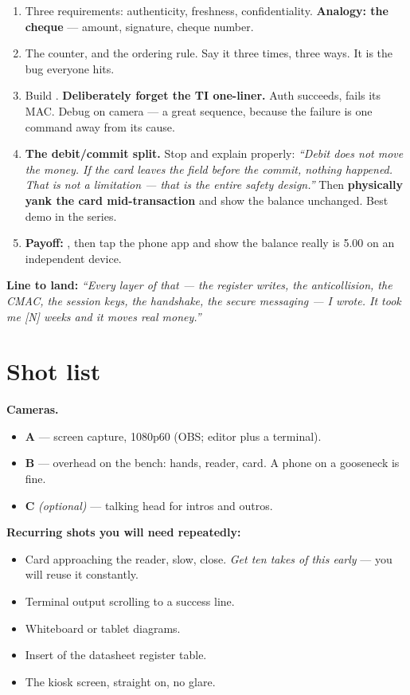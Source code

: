 \begin{enumerate}
  \item Three requirements: authenticity, freshness, confidentiality.
        \textbf{Analogy: the cheque} --- amount, signature, cheque number.
  \item The counter, and the ordering rule. Say it three times, three ways. It is
        the bug everyone hits.
  \item Build . \textbf{Deliberately forget the TI one-liner.}
        Auth succeeds,  fails its MAC. Debug on camera --- a great
        sequence, because the failure is one command away from its cause.
  \item \textbf{The debit/commit split.} Stop and explain properly: \emph{``Debit
        does not move the money. If the card leaves the field before the commit,
        nothing happened. That is not a limitation --- that is the entire safety
        design.''} Then \textbf{physically yank the card mid-transaction} and
        show the balance unchanged. Best demo in the series.
  \item \textbf{Payoff:} , then tap the phone app and show
        the balance really is 5.00 on an independent device.
\end{enumerate}

\textbf{Line to land:} \emph{``Every layer of that --- the register writes, the
anticollision, the CMAC, the session keys, the handshake, the secure messaging
--- I wrote. It took me [N] weeks and it moves real money.''}

\section{Shot list}

\textbf{Cameras.}
\begin{itemize}
  \item \textbf{A} --- screen capture, 1080p60 (OBS; editor plus a terminal).
  \item \textbf{B} --- overhead on the bench: hands, reader, card. A phone on a
        gooseneck is fine.
  \item \textbf{C} \emph{(optional)} --- talking head for intros and outros.
\end{itemize}

\textbf{Recurring shots you will need repeatedly:}
\begin{itemize}
  \item Card approaching the reader, slow, close. \emph{Get ten takes of this
        early} --- you will reuse it constantly.
  \item Terminal output scrolling to a success line.
  \item Whiteboard or tablet diagrams.
  \item Insert of the datasheet register table.
  \item The kiosk screen, straight on, no glare.
\end{itemize}

